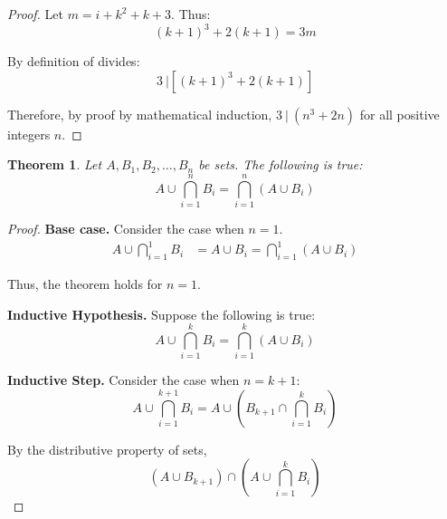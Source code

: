 \documentclass{article}
\newtheorem{theorem}{Theorem}
\numberwithin{subcase}{case}
\begin{document}
\begin{outline}[enumerate]
\begin{proof}
        Let $m = i + k^2 + k + 3$. Thus:
        \begin{equation}
            (k + 1)^3 + 2(k + 1) = 3m
        \end{equation}

        By definition of divides:
        \begin{equation}
            3 \ | \left[(k + 1)^3 + 2(k + 1)\right]
        \end{equation}

        Therefore, by proof by mathematical induction, $3\ |\ (n^3+2n)$ for all positive integers $n$.

    \end{proof}

    \1 
    \2 \begin{theorem}
        Let $A, B_1, B_2, \dots, B_n$ be sets. The following is true:
        \begin{equation}
            A \cup \bigcap\limits^{n}_{i=1} B_i = \bigcap\limits^n_{i=1} (A \cup B_i)               
        \end{equation}
    \end{theorem}

    \begin{proof}
        \textbf{Base case.} Consider the case when $n = 1$.
        \begin{equation}
            \begin{aligned}
                A \cup \bigcap\limits^{1}_{i=1} B_i &= A \cup B_i = \bigcap\limits^{1}_{i=1} (A \cup B_i)
            \end{aligned}
        \end{equation}

        Thus, the theorem holds for $n = 1$.

        \textbf{Inductive Hypothesis.} Suppose the following is true:
        \begin{equation}
            A \cup \bigcap\limits^{k}_{i=1} B_i = \bigcap\limits^k_{i=1} (A \cup B_i)               
        \end{equation}

        \textbf{Inductive Step.} Consider the case when $n = k + 1$:
        \begin{equation}
            A\cup \bigcap\limits^{k + 1}_{i=1} B_i
            = A \cup \left( B_{k+1} \cap \bigcap\limits^{k}_{i=1} B_i \right) 
        \end{equation}

        By the distributive property of sets,
        \begin{equation}
            \left(A \cup B_{k+1}\right) \cap \left(A \cup \bigcap\limits^{k}_{i=1} B_i \right)
        \end{equation}


\end{proof}
\end{outline}
\end{document}
